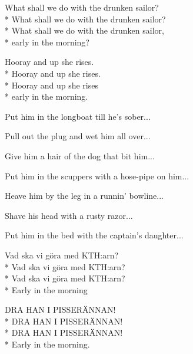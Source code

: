 \begin{SongText}
    \begin{SongVerse}
        What shall we do with the drunken sailor?\\*%
        What shall we do with the drunken sailor?\\*%
        What shall we do with the drunken sailor,\\*%
        early in the morning?
    \end{SongVerse}
    \begin{SongVerse}
        Hooray and up she rises.\\*%
        Hooray and up she rises.\\*%
        Hooray and up she rises\\*%
        early in the morning.
    \end{SongVerse}
    \begin{SongVerse}
        Put him in the longboat till he's sober...
    \end{SongVerse}
    \begin{SongVerse}
        Pull out the plug and wet him all over...
    \end{SongVerse}
    \begin{SongVerse}
        Give him a hair of the dog that bit him...
    \end{SongVerse}
    \begin{SongVerse}
        Put him in the scuppers with a hose-pipe on him...
    \end{SongVerse}
    \begin{SongVerse}
        Heave him by the leg in a runnin' bowline...
    \end{SongVerse}
    \begin{SongVerse}
        Shave his head with a rusty razor...
    \end{SongVerse}
    \begin{SongVerse}
        Put him in the bed with the captain's daughter...
    \end{SongVerse}
    \begin{SongVerse}
        Vad ska vi göra med KTH:arn?\\*%
        Vad ska vi göra med KTH:arn?\\*%
        Vad ska vi göra med KTH:arn?\\*%
        Early in the morning
    \end{SongVerse}
    \begin{SongVerse}
        DRA HAN I PISSERÄNNAN!\\*%
        DRA HAN I PISSERÄNNAN!\\*%
        DRA HAN I PISSERÄNNAN!\\*%
        Early in the morning.
    \end{SongVerse}
\end{SongText}
